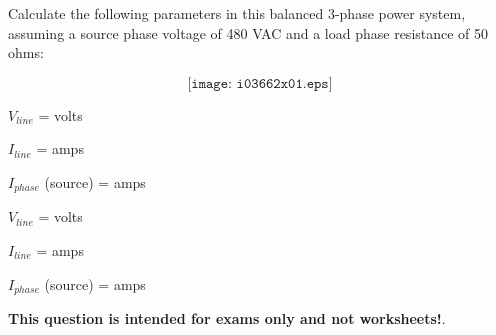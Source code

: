 

Calculate the following parameters in this balanced 3-phase power system, assuming a source phase voltage of 480 VAC and a load phase resistance of 50 ohms:

$$\texttt{[image: i03662x01.eps]}$$

$V_{line}$ = \underbar{\hskip 50pt} volts

\vskip 10pt

$I_{line}$ = \underbar{\hskip 50pt} amps

\vskip 10pt

$I_{phase}$ (source) = \underbar{\hskip 50pt} amps







$V_{line}$ =  volts

$I_{line}$ =  amps

$I_{phase}$ (source) =  amps







{\bf This question is intended for exams only and not worksheets!}.


